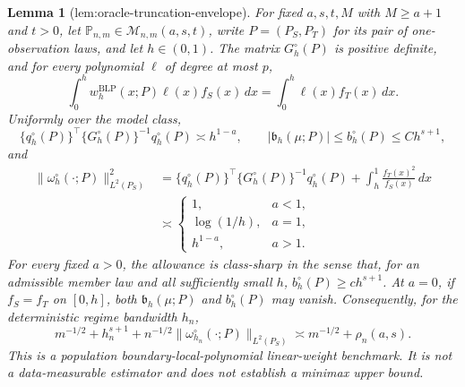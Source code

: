 \documentclass{article}
\newtheorem{lemma}{Lemma}
\begin{document}
\begin{lemma}[lem:oracle-truncation-envelope]\label{lem:oracle-truncation-envelope}
For fixed \(a,s,t,M\) with \(M\ge a+1\) and \(t>0\), let \(\mathbb P_{n,m}\in\mathcal M_{n,m}(a,s,t)\), write \(P=(P_S,P_T)\) for its pair of one-observation laws, and let \(h\in(0,1)\). The matrix \(G_h^{\circ}(P)\) is positive definite, and for every polynomial \(\ell\) of degree at most \(p\),
\[
\int_0^h w_h^{\mathrm{BLP}}(x;P)\ell(x)f_S(x)\,dx
=\int_0^h\ell(x)f_T(x)\,dx.
\]
Uniformly over the model class,
\[
\{q_h^{\circ}(P)\}^{\top}\{G_h^{\circ}(P)\}^{-1}q_h^{\circ}(P)\asymp h^{1-a},
\qquad
|\mathfrak b_h(\mu;P)|\le b_h^{\circ}(P)\le C h^{s+1},
\]
and
\[
\begin{aligned}
\|\omega_h^{\circ}(\cdot;P)\|_{L^2(P_S)}^2
&=\{q_h^{\circ}(P)\}^{\top}\{G_h^{\circ}(P)\}^{-1}q_h^{\circ}(P)
+\int_h^1\frac{f_T(x)^2}{f_S(x)}\,dx\\
&\asymp
\begin{cases}
1,&a<1,\\
\log(1/h),&a=1,\\
h^{1-a},&a>1.
\end{cases}
\end{aligned}
\]
For every fixed \(a>0\), the allowance is class-sharp in the sense that, for an admissible member law and all sufficiently small \(h\), \(b_h^{\circ}(P)\ge c h^{s+1}\). At \(a=0\), if \(f_S=f_T\) on \([0,h]\), both \(\mathfrak b_h(\mu;P)\) and \(b_h^{\circ}(P)\) may vanish. Consequently, for the deterministic regime bandwidth \(h_n\),
\[
m^{-1/2}+h_n^{s+1}+n^{-1/2}\|\omega_{h_n}^{\circ}(\cdot;P)\|_{L^2(P_S)}
\asymp m^{-1/2}+\rho_n(a,s).
\]
This is a population boundary-local-polynomial linear-weight benchmark. It is not a data-measurable estimator and does not establish a minimax upper bound.
\end{lemma}
\end{document}
